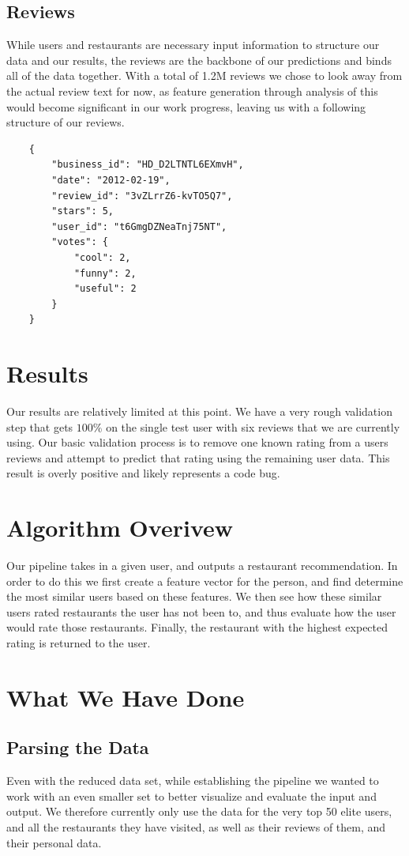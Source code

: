 \documentclass[10pt,twocolumn,letterpaper]{article}
\begin{document}
\subsection{Reviews}
While users and restaurants are necessary input information to structure our data and our results, the reviews are the backbone of our predictions and binds all of the data together. With a total of 1.2M reviews we chose to look away from the actual review text for now, as feature generation through analysis of this would become significant in our work progress, leaving us with a following structure of our reviews.

\begin{verbatim}
	{
	    "business_id": "HD_D2LTNTL6EXmvH",
	    "date": "2012-02-19",
	    "review_id": "3vZLrrZ6-kvTO5Q7",
	    "stars": 5,
	    "user_id": "t6GmgDZNeaTnj75NT",
	    "votes": {
	        "cool": 2,
	        "funny": 2,
	        "useful": 2
	    }
	}
\end{verbatim}

\section{Results}
Our results are relatively limited at this point. We have a very rough validation step that gets $100\%$ on the single test user with six reviews that we are currently using. Our basic validation process is to remove one known rating from a users reviews and attempt to predict that rating using the remaining user data. This result is overly positive and likely represents a code bug.

\section{Algorithm Overivew}

Our pipeline takes in a given user, and outputs a restaurant recommendation. In order to do this we first create a feature vector for the person, and find determine the most similar users based on these features. We then see how these similar users rated restaurants the user has not been to, and thus evaluate how the user would rate those restaurants. Finally, the restaurant with the highest expected rating is returned to the user.

\section{What We Have Done}
\subsection{Parsing the Data}
Even with the reduced data set, while establishing the pipeline we wanted to work with an even smaller set to better visualize and evaluate the input and output. We therefore currently only use the data for the very top 50 elite users, and all the restaurants they have visited, as well as their reviews of them, and their personal data.
\end{document}
